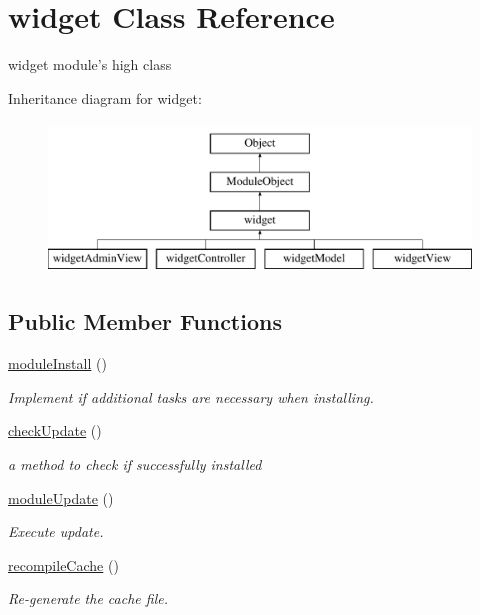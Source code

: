 \hypertarget{classwidget}{\section{widget Class Reference}
\label{classwidget}
}


widget module's high class  


Inheritance diagram for widget\-:\begin{figure}[H]
\begin{center}
\leavevmode
\includegraphics[height=4.000000cm]{classwidget}
\end{center}
\end{figure}
\subsection*{Public Member Functions}
\begin{DoxyCompactItemize}
\item 
\hyperlink{classwidget_ae5a0f29ef320000b10196c8ce3d1bcdc}{module\-Install} ()
\begin{DoxyCompactList}\small\item\em Implement if additional tasks are necessary when installing. \end{DoxyCompactList}\item 
\hyperlink{classwidget_a40ce2841fc3aa0dade2ce5609c08ea9e}{check\-Update} ()
\begin{DoxyCompactList}\small\item\em a method to check if successfully installed \end{DoxyCompactList}\item 
\hyperlink{classwidget_ae12b6e9bc84250539e3aa09c1e1e6f77}{module\-Update} ()
\begin{DoxyCompactList}\small\item\em Execute update. \end{DoxyCompactList}\item 
\hyperlink{classwidget_a958eb4fd79b5c9834f04d866bc6b5d02}{recompile\-Cache} ()
\begin{DoxyCompactList}\small\item\em Re-\/generate the cache file. \end{DoxyCompactList}\end{DoxyCompactItemize}
